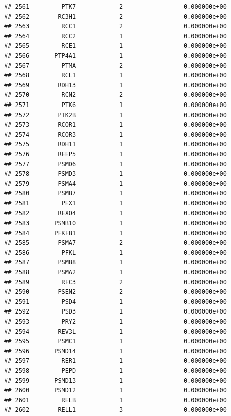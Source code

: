 \documentclass[
]{article}
\begin{document}
\begin{verbatim}
## 2561         PTK7            2                 0.000000e+00
## 2562        RC3H1            2                 0.000000e+00
## 2563         RCC1            2                 0.000000e+00
## 2564         RCC2            1                 0.000000e+00
## 2565         RCE1            1                 0.000000e+00
## 2566       PTP4A1            1                 0.000000e+00
## 2567         PTMA            2                 0.000000e+00
## 2568         RCL1            1                 0.000000e+00
## 2569        RDH13            1                 0.000000e+00
## 2570         RCN2            2                 0.000000e+00
## 2571         PTK6            1                 0.000000e+00
## 2572        PTK2B            1                 0.000000e+00
## 2573        RCOR1            1                 0.000000e+00
## 2574        RCOR3            1                 0.000000e+00
## 2575        RDH11            1                 0.000000e+00
## 2576        REEP5            1                 0.000000e+00
## 2577        PSMD6            1                 0.000000e+00
## 2578        PSMD3            1                 0.000000e+00
## 2579        PSMA4            1                 0.000000e+00
## 2580        PSMB7            1                 0.000000e+00
## 2581         PEX1            1                 0.000000e+00
## 2582        REXO4            1                 0.000000e+00
## 2583       PSMB10            1                 0.000000e+00
## 2584       PFKFB1            1                 0.000000e+00
## 2585        PSMA7            2                 0.000000e+00
## 2586         PFKL            1                 0.000000e+00
## 2587        PSMB8            1                 0.000000e+00
## 2588        PSMA2            1                 0.000000e+00
## 2589         RFC3            2                 0.000000e+00
## 2590        PSEN2            2                 0.000000e+00
## 2591         PSD4            1                 0.000000e+00
## 2592         PSD3            1                 0.000000e+00
## 2593         PRY2            1                 0.000000e+00
## 2594        REV3L            1                 0.000000e+00
## 2595        PSMC1            1                 0.000000e+00
## 2596       PSMD14            1                 0.000000e+00
## 2597         RER1            1                 0.000000e+00
## 2598         PEPD            1                 0.000000e+00
## 2599       PSMD13            1                 0.000000e+00
## 2600       PSMD12            1                 0.000000e+00
## 2601         RELB            1                 0.000000e+00
## 2602        RELL1            3                 0.000000e+00

\end{verbatim}
\end{document}
